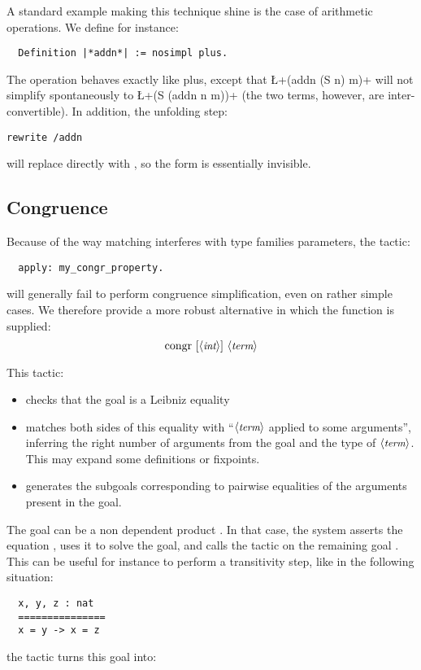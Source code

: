 A standard example making this technique shine is the case of
arithmetic operations. We define for instance:
\begin{lstlisting}
  Definition |*addn*| := nosimpl plus.
\end{lstlisting}
The operation  behaves exactly like plus, except that
\L+(addn (S n) m)+ will not
simplify spontaneously to \L+(S (addn n m))+ (the two terms, however, are
inter-convertible). In addition, the unfolding step:
\begin{lstlisting}
rewrite /addn
\end{lstlisting}
will replace  directly with , so the  form
is essentially invisible.

\subsection{Congruence}\label{ssec:congr}

Because of the way matching interferes with type families parameters,
the tactic:
\begin{lstlisting}
  apply: my_congr_property.
\end{lstlisting}
will generally fail to perform congruence simplification, even on
rather simple cases. We therefore provide a
more robust alternative in which the function is supplied:
$$\C{congr}\ [\N{int}]\ \N{term}$$

This tactic:
\begin{itemize}
\item checks that the goal is a Leibniz equality
\item matches both sides of this equality with ``$\langle\mbox{\itshape\rmfamily\small term}\rangle$ applied to
  some arguments'', inferring the right number of arguments from the goal
  and the type of $\langle\mbox{\itshape\rmfamily\small term}\rangle$. This may
  expand some definitions or fixpoints.
\item generates the subgoals corresponding to pairwise equalities of
  the arguments present in the goal.
\end{itemize}

The goal can be a non dependent product .
In that case, the system asserts the equation , uses it to solve
the goal, and calls the  tactic on the remaining goal
. This can be useful for instance to perform a transitivity
step, like in the following situation:
\begin{lstlisting}
  x, y, z : nat
  ===============
  x = y -> x = z
\end{lstlisting}
the tactic  turns this goal into:


